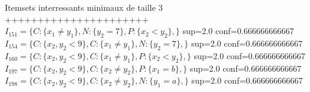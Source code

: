 \documentclass[a4paper,12pt,openany,oneside]{article}
\begin{document}
        Itemsets interressants minimaux de taille 3 ++++++++++++++++++++++\\
        
        $I_{151}=\{C:\{x_{1}\neq y_{1}\},N:\{y_{2}=7\},P:\{x_{2}<y_{2}\},\}$  sup=2.0 conf=0.666666666667\\
        $I_{154}=\{C:\{x_{2},y_{2}<9\},C:\{x_{1}\neq y_{1}\},N:\{y_{2}=7\},\}$  sup=2.0 conf=0.666666666667\\
        $I_{160}=\{C:\{x_{2},y_{2}<9\},C:\{x_{1}\neq y_{1}\},P:\{x_{2}<y_{2}\},\}$  sup=2.0 conf=0.666666666667\\
        $I_{197}=\{C:\{x_{2},y_{2}<9\},C:\{x_{2}\neq y_{2}\},P:\{x_{1}=b\},\}$  sup=2.0 conf=0.666666666667\\
        $I_{198}=\{C:\{x_{2},y_{2}<9\},C:\{x_{2}\neq y_{2}\},N:\{y_{1}=a\},\}$  sup=2.0 conf=0.666666666667\\
 
\end{document}
